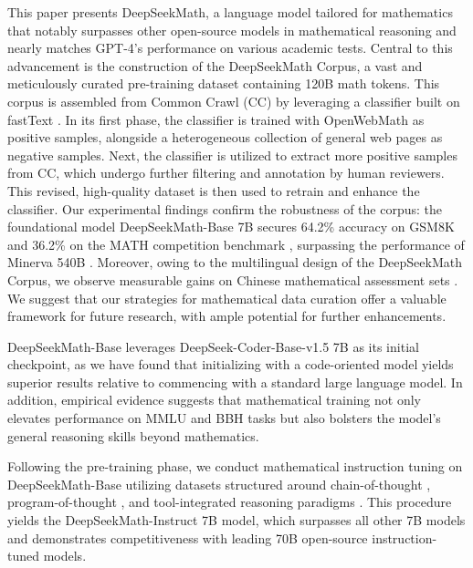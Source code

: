 This paper presents DeepSeekMath, a language model tailored for mathematics that notably surpasses other open-source models in mathematical reasoning and nearly matches GPT-4’s performance on various academic tests. Central to this advancement is the construction of the DeepSeekMath Corpus, a vast and meticulously curated pre-training dataset containing 120B math tokens. This corpus is assembled from Common Crawl (CC) by leveraging a classifier built on fastText \citep{joulin2016fasttext}. In its first phase, the classifier is trained with OpenWebMath \citep{openwebmath} as positive samples, alongside a heterogeneous collection of general web pages as negative samples. Next, the classifier is utilized to extract more positive samples from CC, which undergo further filtering and annotation by human reviewers. This revised, high-quality dataset is then used to retrain and enhance the classifier. Our experimental findings confirm the robustness of the corpus: the foundational model DeepSeekMath-Base 7B secures 64.2\% accuracy on GSM8K \citep{gsm8k} and 36.2\% on the MATH competition benchmark \citep{MATH}, surpassing the performance of Minerva 540B \citep{minerva}. Moreover, owing to the multilingual design of the DeepSeekMath Corpus, we observe measurable gains on Chinese mathematical assessment sets \citep{wei2023cmath,agieval}. We suggest that our strategies for mathematical data curation offer a valuable framework for future research, with ample potential for further enhancements.

DeepSeekMath-Base leverages DeepSeek-Coder-Base-v1.5 7B \citep{deepseek-coder} as its initial checkpoint, as we have found that initializing with a code-oriented model yields superior results relative to commencing with a standard large language model. In addition, empirical evidence suggests that mathematical training not only elevates performance on MMLU \citep{mmlu} and BBH \citep{bbh} tasks but also bolsters the model’s general reasoning skills beyond mathematics.

Following the pre-training phase, we conduct mathematical instruction tuning on DeepSeekMath-Base utilizing datasets structured around chain-of-thought \citep{cot}, program-of-thought \citep{pot,pal}, and tool-integrated reasoning paradigms \citep{tora}. This procedure yields the DeepSeekMath-Instruct 7B model, which surpasses all other 7B models and demonstrates competitiveness with leading 70B open-source instruction-tuned models.

